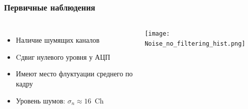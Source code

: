 \documentclass[14pt]{beamer}
\begin{document}
\begin{frame}[c]
\frametitle{Первичные наблюдения}
\vspace{10pt}
\begin{columns}
	\begin{minipage}[t][1\textheight]{\linewidth}
		\vspace{10pt}
		\small{\begin{itemize}
				\item Наличие шумящих каналов
				\item Cдвиг нулевого уровня у АЦП
				\item Имеют место флуктуации среднего по кадру
				\item Уровень шумов: $\sigma_n \approx 16$~Ch
		\end{itemize}}
	\end{minipage}%
	\begin{minipage}[t][1\textheight]{\linewidth}
		\vspace*{8pt}
		\hspace*{5.5pt}
        \texttt{[image: Noise\_no\_filtering\_hist.png]}
	\end{minipage}
\end{columns}
\end{frame}
\end{document}
